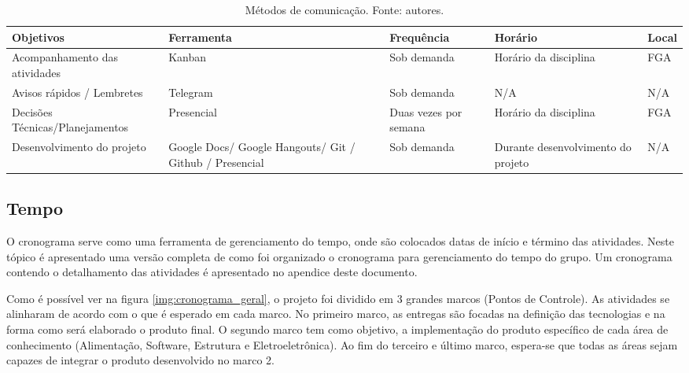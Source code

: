       \begin{table}[!htbp]
      	\begin{center}
      		\caption{\label{tab:com}Métodos de comunicação. Fonte: autores.}
      		\begin{tabular}{|p{4cm}|p{4cm}|p{3cm}|p{3cm}|p{2cm}|}
      			\hline
      			\textbf{Objetivos} & \textbf{Ferramenta} & \textbf{Frequência} & \textbf{Horário} & \textbf{Local}\\\hline\hline
      			Acompanhamento das atividades & Kanban & Sob demanda & Horário da disciplina & FGA\\\hline
      			Avisos rápidos / Lembretes & Telegram & Sob demanda & N/A & N/A\\\hline
      			Decisões Técnicas/Planejamentos & Presencial & Duas vezes por semana & Horário da disciplina & FGA\\\hline
      			Desenvolvimento do projeto & Google Docs/ Google Hangouts/ Git / Github / Presencial & Sob demanda & Durante desenvolvimento do projeto & N/A\\\hline
      		\end{tabular}
      	\end{center}
      \end{table}

    \subsection{Tempo}
	O cronograma serve como uma ferramenta de gerenciamento do tempo, onde são colocados datas de início e término das atividades. Neste tópico é apresentado uma versão completa de como foi organizado o cronograma para gerenciamento do tempo do grupo. Um cronograma contendo o detalhamento das atividades é apresentado no apendice deste documento.

	Como é possível ver na figura \ref{img:cronograma_geral}, o projeto foi dividido em 3 grandes marcos (Pontos de Controle). As atividades se alinharam de acordo com o que é esperado em cada marco. No primeiro marco, as entregas são focadas na definição das tecnologias e na forma como será elaborado o produto final. O segundo marco tem como objetivo, a implementação do produto específico de cada área de conhecimento (Alimentação, Software, Estrutura e Eletroeletrônica). Ao fim do terceiro e último marco, espera-se que todas as áreas sejam capazes de integrar o produto desenvolvido no marco 2. 

